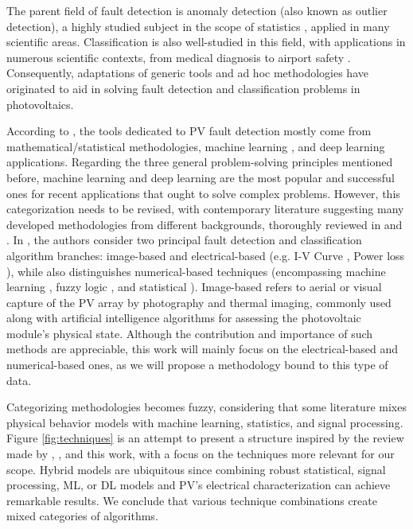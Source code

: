 The parent field of fault detection is anomaly detection (also known as outlier detection), a highly studied subject in the scope of statistics \cite{Prasad2009}, applied in many scientific areas. Classification is also well-studied in this field, with applications in numerous scientific contexts, from medical diagnosis to airport safety \cite{classification}. Consequently, adaptations of generic tools and ad hoc methodologies have originated to aid in solving fault detection and classification problems in photovoltaics.

According to \cite{AIPV}, the tools dedicated to PV fault detection mostly come from mathematical/statistical methodologies, machine learning , and deep learning applications. Regarding the three general problem-solving principles mentioned before, machine learning and deep learning are the most popular and successful ones for recent applications that ought to solve complex problems. However, this categorization needs to be revised, with contemporary literature suggesting many developed methodologies from different backgrounds, thoroughly reviewed in \cite{Hong2022} and \cite{Livera2019}. In \cite{Hong2022}, the authors consider two principal fault detection and classification algorithm branches: image-based and electrical-based (e.g. I-V Curve \cite{e_iv_1}\cite{e_iv_2}\cite{e_iv_3}, Power loss \cite{e_pl_1}\cite{e_pl_2}\cite{e_pl_3}\cite{e_pl_4}\cite{e_pl_5}), while \cite{Livera2019} also distinguishes numerical-based techniques (encompassing machine learning \cite{n_ann_1}\cite{n_ann_2}\cite{n_ann_3}, fuzzy logic \cite{n_f_1}\cite{n_f_2}\cite{n_f_3}, and statistical \cite{n_s_1}\cite{n_s_2}\cite{n_s_3}). Image-based refers to aerial or visual capture of the PV array by photography and thermal imaging, commonly used along with artificial intelligence algorithms for assessing the photovoltaic module's physical state. Although the contribution and importance of such methods are appreciable, this work will mainly focus on the electrical-based and numerical-based ones, as we will propose a methodology bound to this type of data.

Categorizing methodologies becomes fuzzy, considering that some literature mixes physical behavior models with machine learning, statistics, and signal processing. Figure \ref{fig:techniques} is an attempt to present a structure inspired by the review made by \cite{Hong2022}, \cite{Livera2019}, and this work, with a focus on the techniques more relevant for our scope. Hybrid models are ubiquitous since combining robust statistical, signal processing, ML, or DL models and PV's electrical characterization can achieve remarkable results. We conclude that various technique combinations create mixed categories of algorithms.
 
